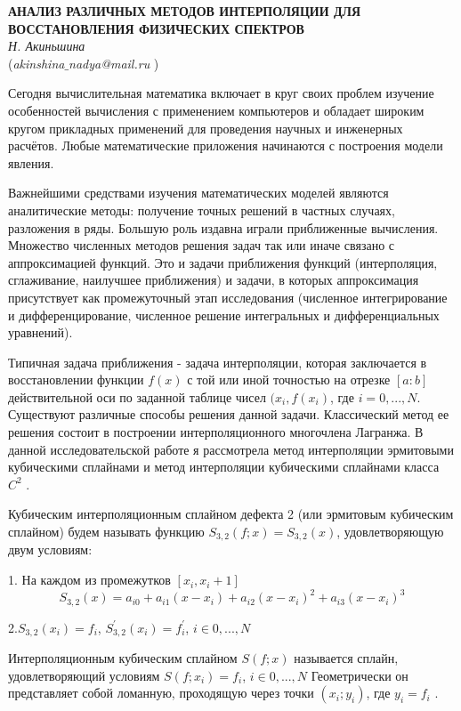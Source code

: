 \begin{center}{ \bf  АНАЛИЗ РАЗЛИЧНЫХ МЕТОДОВ ИНТЕРПОЛЯЦИИ ДЛЯ ВОССТАНОВЛЕНИЯ ФИЗИЧЕСКИХ СПЕКТРОВ}\\
{\it Н. Акиньшина } \\
({\it akinshina$\_$nadya@mail.ru} )
\end{center}

Сегодня вычислительная математика включает в круг своих проблем изучение особенностей вычисления с применением компьютеров и обладает широким кругом прикладных применений для проведения научных и инженерных расчётов. Любые математические приложения начинаются с построения модели явления.

Важнейшими средствами изучения математических моделей являются аналитические методы: получение точных решений в частных случаях, разложения в ряды. Большую роль издавна играли приближенные вычисления. Множество численных методов решения задач так или иначе связано с аппроксимацией функций. Это и задачи приближения функций (интерполяция, сглаживание, наилучшее приближения) и задачи, в которых аппроксимация присутствует как промежуточный этап исследования (численное интегрирование и дифференцирование, численное решение интегральных и дифференциальных уравнений).

Типичная задача приближения - задача интерполяции, которая заключается в восстановлении функции $f(x)$ с той или иной точностью на отрезке $[a:b]$ действительной оси по заданной таблице чисел $(x_i, f(x_i)$, где $i=0,...,N$. Существуют различные способы решения данной задачи. Классический метод ее решения состоит в построении интерполяционного многочлена Лагранжа.
В данной исследовательской работе я рассмотрела метод интерполяции эрмитовыми кубическими сплайнами и метод интерполяции кубическими сплайнами класса $C^2$ .

Кубическим интерполяционным сплайном дефекта 2
\linebreak
(или эрмитовым кубическим сплайном) будем называть фу\-н\-к\-цию
$S_{3,2}(f;x)=S_{3,2}(x)$, удовлетворяющую двум условиям:

1. На каждом из промежутков $[x_i,x_i+1]$
$$S_{3,2}(x)=a_{i0}+a_{i1}(x-x_i)+a_{i2}(x-x_i)^2+a_{i3}(x-x_i)^3$$

2.$S_{3,2}(x_i)=f_i$, $S_{3,2}^{'}(x_i)=f_i^{'}$, $i\in 0,...,N$

Интерполяционным кубическим сплайном $S(f;x)$  называется сплайн, удовлетворяющий условиям
 $S(f;x_i)=f_i$, $i\in 0,...,N$
 Геометрически он представляет собой ломанную, проходящую через точки $(x_i;y_i)$, где $y_i=f_i$ .

